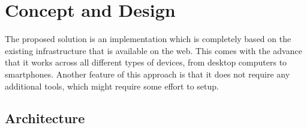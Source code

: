 \chapter{Concept and Design}
\label{cha:conceptanddesign}

The proposed solution is an implementation which is completely based on the existing infrastructure that is available on the web. This comes with the advance that it works across all different types of devices, from desktop computers to smartphones. Another feature of this approach is that it does not require any additional tools, which might require some effort to setup.
\section{Architecture}

